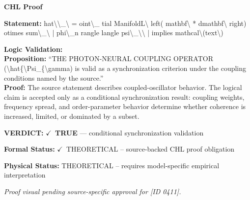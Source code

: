 \vspace{0.45em}
\noindent\textbf{CHL Proof}\par
\textbf{Statement:} hat\textbackslash{}\textbackslash{}\_\textbackslash{} = oint\textbackslash{}\_ tial ManifoldL\textbackslash{} left( mathbf\textbackslash{} * dmathbf\textbackslash{} right) otimes sum\textbackslash{}\_\textbackslash{} | phi\textbackslash{}\_n
rangle langle psi\textbackslash{}\_\textbackslash{}\textbackslash{} | implies mathcal\textbackslash{}(text\textbackslash{})

\textbf{Logic Validation:}\\
\textbf{Proposition:} ``THE PHOTON-NEURAL COUPLING OPERATOR (\textbackslash{}hat\{\textbackslash{}Psi\_\{\textbackslash{}gamma) is valid as a synchronization
criterion under the coupling conditions named by the source.''\\
\textbf{Proof:} The source statement describes coupled-oscillator behavior. The logical claim is
accepted only as a conditional synchronization result: coupling weights, frequency
spread, and order-parameter behavior determine whether coherence is increased, limited,
or dominated by a subset.

\textbf{VERDICT:} \ensuremath{\checkmark}\ \textbf{TRUE} --- conditional synchronization validation

\textbf{Formal Status:} \ensuremath{\checkmark}\ THEORETICAL -- source-backed CHL proof obligation

\textbf{Physical Status:} THEORETICAL -- requires model-specific empirical interpretation
\par\vspace{0.45em}
\par
\vfill
\begingroup\footnotesize\itshape
Proof visual pending source-specific approval for [ID 0411].
\par\endgroup
\vfill
\endgroup
\endgroup
